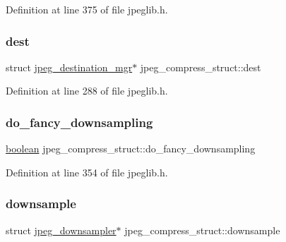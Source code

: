 Definition at line 375 of file jpeglib.\+h.

\mbox{\label{structjpeg__compress__struct_ab31c2c756e309dee8d0318557353ba40}} 
\subsubsection{\texorpdfstring{dest}{dest}}
{\footnotesize\ttfamily struct \mbox{\hyperlink{structjpeg__destination__mgr}{jpeg\+\_\+destination\+\_\+mgr}}$\ast$ jpeg\+\_\+compress\+\_\+struct\+::dest}



Definition at line 288 of file jpeglib.\+h.

\mbox{\label{structjpeg__compress__struct_a683db079af3beb44eaab5b421a5a9d4f}} 
\subsubsection{\texorpdfstring{do\_fancy\_downsampling}{do\_fancy\_downsampling}}
{\footnotesize\ttfamily \mbox{\hyperlink{jmorecfg_8h_a7c6368b321bd9acd0149b030bb8275ed}{boolean}} jpeg\+\_\+compress\+\_\+struct\+::do\+\_\+fancy\+\_\+downsampling}



Definition at line 354 of file jpeglib.\+h.

\mbox{\label{structjpeg__compress__struct_a65a72b804640a0c339863f6562098113}} 
\subsubsection{\texorpdfstring{downsample}{downsample}}
{\footnotesize\ttfamily struct \mbox{\hyperlink{structjpeg__downsampler}{jpeg\+\_\+downsampler}}$\ast$ jpeg\+\_\+compress\+\_\+struct\+::downsample}



